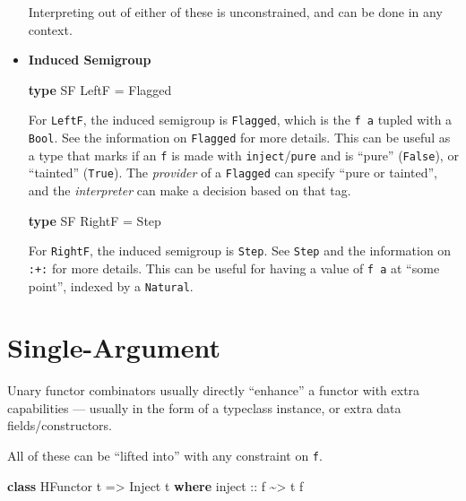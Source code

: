 \documentclass[]{article}
\newenvironment{Shaded}{}{}
\newcommand{\DataTypeTok}[1]{\textcolor[rgb]{0.56,0.13,0.00}{#1}}
\newcommand{\KeywordTok}[1]{\textcolor[rgb]{0.00,0.44,0.13}{\textbf{#1}}}
\newcommand{\NormalTok}[1]{#1}
\newcommand{\OperatorTok}[1]{\textcolor[rgb]{0.40,0.40,0.40}{#1}}
\newcommand{\OtherTok}[1]{\textcolor[rgb]{0.00,0.44,0.13}{#1}}
\begin{document}
\begin{itemize}
  Interpreting out of either of these is unconstrained, and can be done in any
  context.
\item
  \textbf{Induced Semigroup}

\begin{Shaded}
\begin{Highlighting}[]
\KeywordTok{type} \DataTypeTok{SF} \DataTypeTok{LeftF} \OtherTok{=} \DataTypeTok{Flagged}
\end{Highlighting}
\end{Shaded}

  For \texttt{LeftF}, the induced semigroup is \texttt{Flagged}, which is the
  \texttt{f\ a} tupled with a \texttt{Bool}. See the information on
  \texttt{Flagged} for more details. This can be useful as a type that marks if
  an \texttt{f} is made with \texttt{inject}/\texttt{pure} and is ``pure''
  (\texttt{False}), or ``tainted'' (\texttt{True}). The \emph{provider} of a
  \texttt{Flagged} can specify ``pure or tainted'', and the \emph{interpreter}
  can make a decision based on that tag.

\begin{Shaded}
\begin{Highlighting}[]
\KeywordTok{type} \DataTypeTok{SF} \DataTypeTok{RightF} \OtherTok{=} \DataTypeTok{Step}
\end{Highlighting}
\end{Shaded}

  For \texttt{RightF}, the induced semigroup is \texttt{Step}. See \texttt{Step}
  and the information on \texttt{:+:} for more details. This can be useful for
  having a value of \texttt{f\ a} at ``some point'', indexed by a
  \texttt{Natural}.
\end{itemize}

\hypertarget{single-argument}{%
\section{Single-Argument}\label{single-argument}}

Unary functor combinators usually directly ``enhance'' a functor with extra
capabilities --- usually in the form of a typeclass instance, or extra data
fields/constructors.

All of these can be ``lifted into'' with any constraint on \texttt{f}.

\begin{Shaded}
\begin{Highlighting}[]
\KeywordTok{class} \DataTypeTok{HFunctor}\NormalTok{ t }\OtherTok{=>} \DataTypeTok{Inject}\NormalTok{ t }\KeywordTok{where}
\OtherTok{    inject ::}\NormalTok{ f }\OperatorTok{\textasciitilde{}>}\NormalTok{ t f}
\end{Highlighting}
\end{Shaded}
\end{document}
